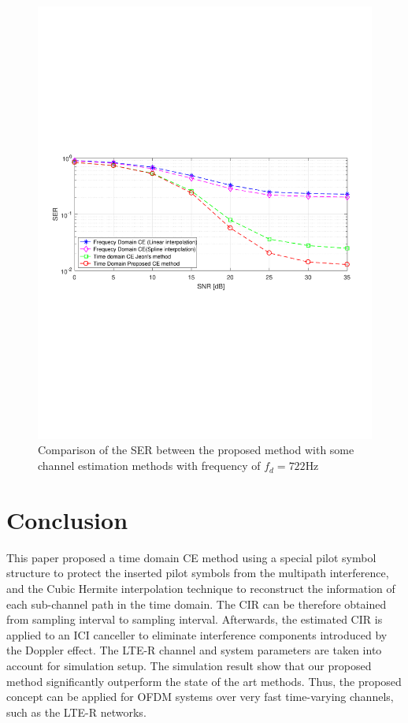 \documentclass[AMA]{WileyNJD-v1}
\begin{document}
{{{\begin{figure}
	\centering
	\includegraphics[width=1.0\linewidth]{figures/ser_722Hz.pdf}
	\caption{Comparison of the SER between the proposed
						method with some channel estimation methods with
						frequency of $f_{d}=722$Hz}
	\label{fig:ser722hz}
\end{figure}	
%	
\section{Conclusion}\label{section-5}
				
This paper proposed a time domain CE method using a special pilot symbol structure to protect the inserted pilot symbols from the multipath interference, and the Cubic Hermite interpolation technique to reconstruct the information of each sub-channel path in the time domain. The CIR can be therefore obtained from sampling interval to  sampling interval. Afterwards, the estimated CIR is applied to an ICI canceller to eliminate interference components introduced by the Doppler effect. The LTE-R channel and system parameters are taken into account for simulation setup. The simulation result show that our proposed method significantly outperform the state of the art methods. Thus, the proposed concept can be applied for OFDM systems over very fast time-varying channels, such as the LTE-R networks.
				
}}}
\end{document}
